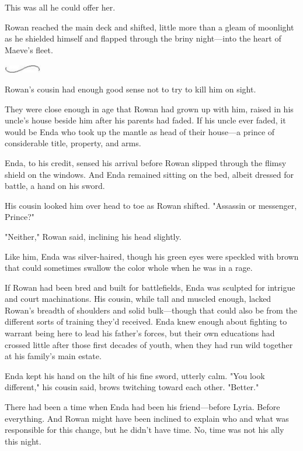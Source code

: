 This was all he could offer her.

Rowan reached the main deck and shifted, little more than a gleam of moonlight as he shielded himself and flapped through the briny night---into the heart of Maeve's fleet.

\includegraphics[width=0.65in,height=0.13in]{images/seperator}

Rowan's cousin had enough good sense not to try to kill him on sight.

They were close enough in age that Rowan had grown up with him, raised in his uncle's house beside him after his parents had faded. If his uncle ever faded, it would be Enda who took up the mantle as head of their house---a prince of considerable title, property, and arms.

Enda, to his credit, sensed his arrival before Rowan slipped through the flimsy shield on the windows. And Enda remained sitting on the bed, albeit dressed for battle, a hand on his sword.

His cousin looked him over head to toe as Rowan shifted. "Assassin or messenger, Prince?"

"Neither," Rowan said, inclining his head slightly.

Like him, Enda was silver-haired, though his green eyes were speckled with brown that could sometimes swallow the color whole when he was in a rage.

If Rowan had been bred and built for battlefields, Enda was sculpted for intrigue and court machinations. His cousin, while tall and muscled enough, lacked Rowan's breadth of shoulders and solid bulk---though that could also be from the different sorts of training they'd received. Enda knew enough about fighting to warrant being here to lead his father's forces, but their own educations had crossed little after those first decades of youth, when they had run wild together at his family's main estate.

Enda kept his hand on the hilt of his fine sword, utterly calm. "You look  different," his cousin said, brows twitching toward each other. "Better."

There had been a time when Enda had been his friend---before Lyria. Before  everything. And Rowan might have been inclined to explain who and what was responsible for this change, but he didn't have time. No, time was not his ally this night.

